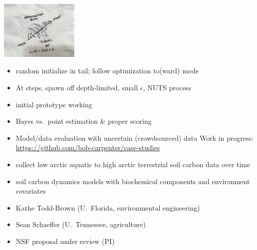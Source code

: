 \documentclass[10pt]{report}
\begin{document}
\vspace*{-3pt}
\begin{center}
\includegraphics[width=0.28\textwidth]{img/napkin-adapt.jpg}
\end{center}
\vspace*{-3pt}
\begin{itemize}
\item random initialize in tail; follow optimization to(ward) mode
\item At steps, spawn off depth-limited, small $\epsilon$, NUTS process
\item initial prototype working
\end{itemize}

\begin{itemize}
\item Bayes vs.\ point estimation \& proper scoring
\item Model/data evaluation with uncertain (crowdsourced) data
\vfill
\noindent
{\footnotesize Work in progress: \url{https://github.com/bob-carpenter/case-studies}}
\end{itemize}

\begin{itemize}
\item collect low arctic aquatic to high arctic terrestrial soil carbon data over time
\item soil carbon dynamics models with biochemical components and environment covariates
\item Kathe Todd-Brown (U.\ Florida, environmental engineering)
\item Sean Schaeffer (U.\ Tennessee, agriculture)
\vfill
\item {\footnotesize NSF proposal under review (PI)}
\end{itemize}
\end{document}
